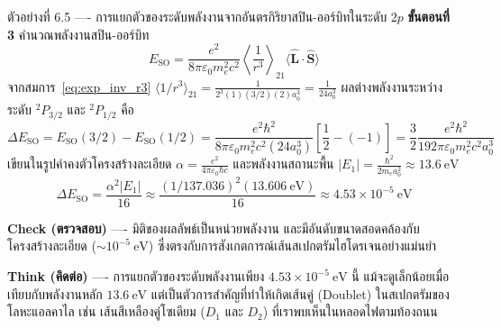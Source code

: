 \begin{psctbox}{ตัวอย่างที่ 6.5 ---- การแยกตัวของระดับพลังงานจากอันตรกิริยาสปิน-ออร์บิทในระดับ $2p$}
\textbf{ขั้นตอนที่ 3} คำนวณพลังงานสปิน-ออร์บิท
\begin{equation*}
E_{\text{SO}} = \frac{e^2}{8\pi\varepsilon_0 m_e^2 c^2} \left\langle \frac{1}{r^3} \right\rangle_{21} \langle \hat{\mathbf{L}}\cdot\hat{\mathbf{S}} \rangle
\end{equation*}
จากสมการ~\eqref{eq:exp_inv_r3} $\langle 1/r^3 \rangle_{21} = \frac{1}{2^3 (1)(3/2)(2) a_0^3} = \frac{1}{24 a_0^3}$
ผลต่างพลังงานระหว่างระดับ $^2P_{3/2}$ และ $^2P_{1/2}$ คือ
\begin{equation*}
\Delta E_{\text{SO}} = E_{\text{SO}}(3/2) - E_{\text{SO}}(1/2) = \frac{e^2 \hbar^2}{8\pi\varepsilon_0 m_e^2 c^2 (24 a_0^3)} \left[ \frac{1}{2} - (-1) \right] = \frac{3}{2} \frac{e^2 \hbar^2}{192 \pi\varepsilon_0 m_e^2 c^2 a_0^3}
\end{equation*}
เขียนในรูปค่าคงตัวโครงสร้างละเอียด $\alpha = \frac{e^2}{4\pi\varepsilon_0 \hbar c}$ และพลังงานสถานะพื้น $|E_1| = \frac{\hbar^2}{2m_e a_0^2} \approx 13.6~\text{eV}$
\begin{equation*}
\Delta E_{\text{SO}} = \frac{\alpha^2 |E_1|}{16} \approx \frac{(1/137.036)^2 (13.606~\text{eV})}{16} \approx 4.53 \times 10^{-5}~\text{eV}
\end{equation*}

\textbf{Check (ตรวจสอบ)} ---- มิติของผลลัพธ์เป็นหน่วยพลังงาน และมีอันดับขนาดสอดคล้องกับโครงสร้างละเอียด ($\sim 10^{-5}~\text{eV}$) ซึ่งตรงกับการสังเกตการณ์เส้นสเปกตรัมไฮโดรเจนอย่างแม่นยำ

\textbf{Think (คิดต่อ)} ---- การแยกตัวของระดับพลังงานเพียง $4.53 \times 10^{-5}~\text{eV}$ นี้ แม้จะดูเล็กน้อยเมื่อเทียบกับพลังงานหลัก $13.6~\text{eV}$ แต่เป็นตัวการสำคัญที่ทำให้เกิดเส้นคู่ (Doublet) ในสเปกตรัมของโลหะแอลคาไล เช่น เส้นสีเหลืองคู่โซเดียม ($D_1$ และ $D_2$) ที่เราพบเห็นในหลอดไฟตามท้องถนน
\end{psctbox}


